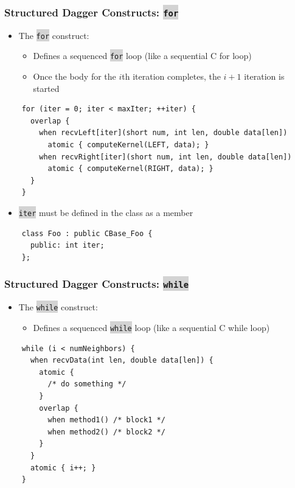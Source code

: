 \documentclass{beamer}
\newcommand{\code}[1]{\colorbox{lightgray}{\texttt{#1}}}
\begin{document}
\begin{frame}[fragile]
  \frametitle{Structured Dagger Constructs: \code{for}}
  \begin{itemize}
  \item The \code{for} construct:
    \begin{itemize}
    \item Defines a sequenced \code{for} loop (like a sequential C for loop)
    \item Once the body for the $i$th iteration completes, the $i+1$ iteration
      is started
    \end{itemize}
  \end{itemize}
  \begin{lstlisting}
    for (iter = 0; iter < maxIter; ++iter) {
      overlap {
        when recvLeft[iter](short num, int len, double data[len])
          atomic { computeKernel(LEFT, data); }
        when recvRight[iter](short num, int len, double data[len])
          atomic { computeKernel(RIGHT, data); }
      }
    }
  \end{lstlisting}
  \begin{itemize}
  \item \code{iter} must be defined in the class as a member
  \end{itemize}
  \begin{lstlisting}
    class Foo : public CBase_Foo {
      public: int iter;
    };
  \end{lstlisting}
\end{frame}

\begin{frame}[fragile]
  \frametitle{Structured Dagger Constructs: \code{while}}
  \begin{itemize}
  \item The \code{while} construct:
    \begin{itemize}
    \item Defines a sequenced \code{while} loop (like a sequential C while loop)
    \end{itemize}
  \end{itemize}
  \begin{lstlisting}
    while (i < numNeighbors) {
      when recvData(int len, double data[len]) {
        atomic {
          /* do something */
        }
        overlap {
          when method1() /* block1 */
          when method2() /* block2 */
        }
      }
      atomic { i++; }
    }
  \end{lstlisting}
\end{frame}
\end{document}
